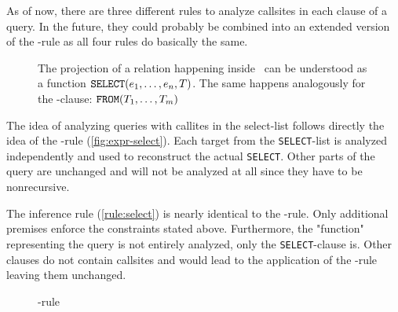 As of now, there are three different rules to analyze callsites in each clause of a query. In the future, they could probably be combined into an extended version of the \REXPR-rule as all four rules do basically the same.

\begin{figure}[h!]
    \centering
    
    \caption{The projection of a relation happening inside \SELECT~can be understood as a function $\text{\texttt{SELECT}}(e_1, \dots, e_n, T)$. The same happens analogously for the \FROM-clause: $\text{\texttt{FROM}}(T_1, \dots, T_m)$}
    \label{fig:expr-select}
\end{figure}

The idea of analyzing queries with callites in the select-list follows directly the idea of the \REXPR-rule (\autoref{fig:expr-select}). Each target from the \texttt{SELECT}-list is analyzed independently and used to reconstruct the actual \texttt{SELECT}. Other parts of the query are unchanged and will not be analyzed at all since they have to be nonrecursive.

The inference rule (\autoref{rule:select}) is nearly identical to the \REXPR-rule. Only additional premises enforce the constraints stated above. Furthermore, the "function" representing the query is not entirely analyzed, only the \texttt{SELECT}-clause is. Other clauses do not contain callsites and would lead to the application of the \RBASE-rule leaving them unchanged.

\begin{figure}[h!]
    \centering\footnotesize
    \caption{\RSELECT-rule}
    \label{rule:select}
\end{figure}




